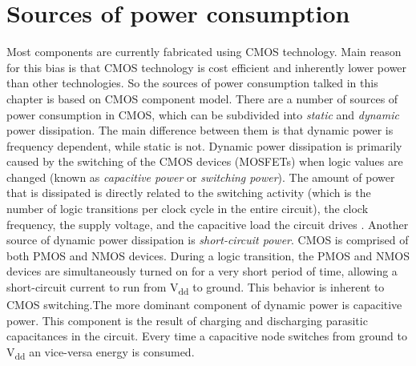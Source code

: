 \section{Sources of power consumption}\label{src_pwr}
Most components are currently fabricated using CMOS technology\cite{cypress,silicon}. Main reason for this bias is that CMOS technology is cost efficient and inherently lower power than other technologies. So the sources of power consumption talked in this chapter is based on CMOS component model. There are a number of sources of power consumption in CMOS, which can be subdivided into \textit{static} and \textit{dynamic} power dissipation. The main difference between them is that dynamic power is frequency dependent, while static is not. Dynamic power dissipation is primarily caused by the switching of the CMOS devices (MOSFETs) when logic values are changed (known as \textit{capacitive power} or \textit{switching power}). The amount of power that is dissipated is directly related to the switching activity (which is the number of logic transitions per clock cycle in the entire circuit), the clock frequency, the supply voltage, and the capacitive load the circuit drives \cite{PowerAwareDesign}. Another source of dynamic power dissipation is \textit{short-circuit power}. CMOS is comprised of both PMOS and NMOS devices. During a logic transition, the PMOS and NMOS devices are simultaneously turned on for a very short period of time, allowing a short-circuit current to run from V\textsubscript{dd} to ground\cite{Low-powercmos,LowPowerDesign}. This behavior is inherent to CMOS switching.The more dominant component of dynamic power is capacitive power. This component is the result of charging and discharging parasitic capacitances in the circuit. Every time a capacitive node switches from ground to V\textsubscript{dd} an vice-versa energy is consumed. 

